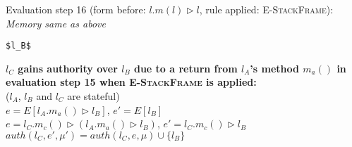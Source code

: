 \documentclass{llncs}
\begin{document}
\vspace{12pt}
\noindent Evaluation step 16 (form before: $l.m(l) \rhd l$, rule applied: \textsc{E-StackFrame}):\\
\vspace{-6pt}
\indent\textit{Memory same as above}\\
\vspace{-6pt}
\begin{lstlisting}[xleftmargin=20pt]
$l_B$
\end{lstlisting}


\newpage

\noindent\textbf{$l_C$ gains authority over $l_B$ due to a return from $l_A$'s method $m_a()$ in evaluation step 15 when \textsc{E-StackFrame} is applied:}\\

\noindent ($l_A$, $l_B$ and $l_C$ are stateful)\\

\noindent$e = E[l_A.m_a() \rhd l_B]$, $e' = E[l_B]$\\

\noindent$e = l_C.m_c() \rhd (l_A.m_a() \rhd l_B)$, $e' = l_C.m_c() \rhd l_B$\\

\noindent$auth(l_C, e', \mu') = auth(l_C, e, \mu) \cup \{ l_B \}$
\end{document}
